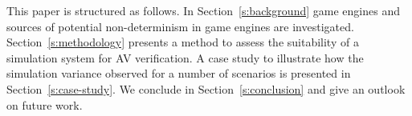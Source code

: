 \documentclass[letterpaper, 10 pt, journal, twoside]{IEEEtran}
\begin{document}
This paper is structured as follows. In Section~\ref{s:background} game engines and sources of potential non-determinism in game engines are investigated. Section~\ref{s:methodology} presents a method to assess the suitability of a simulation system for AV verification. 
%
A case study to illustrate how the simulation variance observed for a number of scenarios is presented in Section~\ref{s:case-study}. We conclude in Section~\ref{s:conclusion} and give an outlook on future work.







\end{document}
